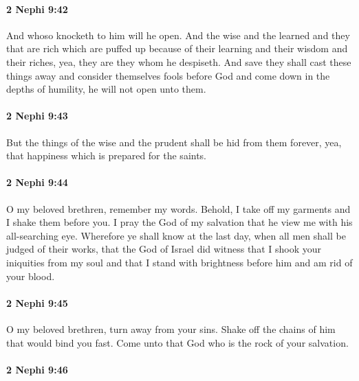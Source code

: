 		\paragraph{2 Nephi 9:42} %
			\label{2NEPHI-9-42}

			And whoso knocketh to him will he open.
			And the wise and the learned and they that are rich
			which are puffed up because of their learning and their wisdom and their riches,
			yea, they are they whom he despiseth.
			And save they shall cast these things away
			and consider themselves fools before God
			and come down in the depths of humility,
			he will not open unto them.

		\paragraph{2 Nephi 9:43} %
			\label{2NEPHI-9-43}

			But the things of the wise and the prudent shall be hid from them forever,
			yea, that happiness which is prepared for the saints.

		\paragraph{2 Nephi 9:44} %
			\label{2NEPHI-9-44}

			O my beloved brethren, remember my words.
			Behold, I take off my garments and I shake them before you.
			I pray the God of my salvation that he view me with his all-searching eye.
			Wherefore ye shall know at the last day,
			when all men shall be judged of their works,
			that the God of Israel did witness
			that I shook your iniquities from my soul
			and that I stand with brightness before him
			and am rid of your blood.

		\paragraph{2 Nephi 9:45} %
			\label{2NEPHI-9-45}

			O my beloved brethren, turn away from your sins.
			Shake off the chains of him that would bind you fast.
			Come unto that God who is the rock of your salvation.

		\paragraph{2 Nephi 9:46} %
			\label{2NEPHI-9-46}

